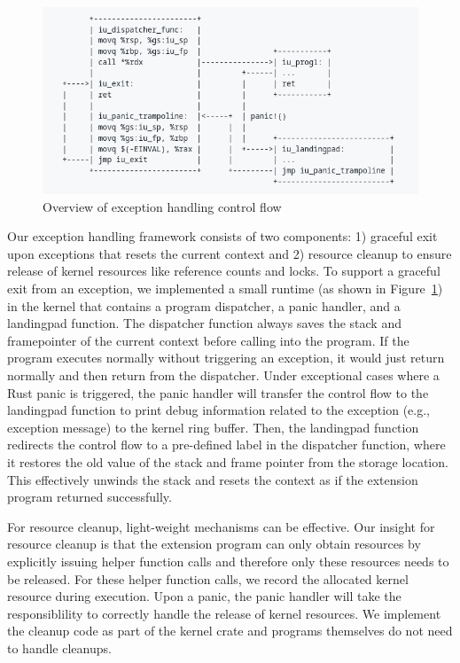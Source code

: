 \begin{figure}
	\includegraphics[width=0.8\linewidth]{figs/EH.png}
	\centering
	\vspace{-10pt}
	\caption{Overview of exception handling control flow}
	\label{fig:eh-overview}
	\vspace{-10pt}
\end{figure}

Our exception handling framework consists of two components: 1) graceful exit
    upon exceptions that resets the current context and 2) resource cleanup to
    ensure release of kernel resources like reference counts and locks.
To support a graceful exit from an exception, we implemented a small runtime
    (as shown in Figure~\ref{fig:eh-overview}) in the kernel that contains a
    program dispatcher, a panic handler, and a landingpad function.
The dispatcher function always saves the stack and framepointer of the current
    context before calling into the program.
If the program executes normally without triggering an exception, it would just
    return normally and then return from the dispatcher.
Under exceptional cases where a Rust panic is triggered, the panic handler will
    transfer the control flow to the landingpad function to print debug
    information related to the exception (e.g., exception message) to the
    kernel ring buffer.
Then, the landingpad function redirects the control flow to a pre-defined label
    in the dispatcher function, where it restores the old value of the stack
    and frame pointer from the storage location.
This effectively unwinds the stack and resets the context as if the extension
    program returned successfully.

For resource cleanup, light-weight mechanisms can be effective.
Our insight for resource cleanup is that the extension program can only obtain
    resources by explicitly issuing helper function calls and therefore only
    these resources needs to be released.
For these helper function calls, we record the allocated kernel resource during
    execution.
Upon a panic, the panic handler will take the responsiblility to correctly
    handle the release of kernel resources.
We implement the cleanup code as part of the \projname{} kernel crate
    and programs themselves do not need to handle cleanups.

